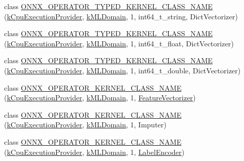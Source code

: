 \begin{DoxyCompactItemize}
\item 
class \mbox{\hyperlink{namespaceonnxruntime_1_1ml_a7ea36715d290134d65e5d820380a5ae7}{O\+N\+N\+X\+\_\+\+O\+P\+E\+R\+A\+T\+O\+R\+\_\+\+T\+Y\+P\+E\+D\+\_\+\+K\+E\+R\+N\+E\+L\+\_\+\+C\+L\+A\+S\+S\+\_\+\+N\+A\+ME}} (\mbox{\hyperlink{namespaceonnxruntime_a394a3c7e50622de1f203a96df592060d}{k\+Cpu\+Execution\+Provider}}, \mbox{\hyperlink{namespaceonnxruntime_a76df7dd63759039fc62486d6691e70e5}{k\+M\+L\+Domain}}, 1, int64\+\_\+t\+\_\+string, Dict\+Vectorizer)
\item 
class \mbox{\hyperlink{namespaceonnxruntime_1_1ml_abb607362e12f644526ed85340eddeaf0}{O\+N\+N\+X\+\_\+\+O\+P\+E\+R\+A\+T\+O\+R\+\_\+\+T\+Y\+P\+E\+D\+\_\+\+K\+E\+R\+N\+E\+L\+\_\+\+C\+L\+A\+S\+S\+\_\+\+N\+A\+ME}} (\mbox{\hyperlink{namespaceonnxruntime_a394a3c7e50622de1f203a96df592060d}{k\+Cpu\+Execution\+Provider}}, \mbox{\hyperlink{namespaceonnxruntime_a76df7dd63759039fc62486d6691e70e5}{k\+M\+L\+Domain}}, 1, int64\+\_\+t\+\_\+float, Dict\+Vectorizer)
\item 
class \mbox{\hyperlink{namespaceonnxruntime_1_1ml_af807d4f4a563446d130e43cbb6556b87}{O\+N\+N\+X\+\_\+\+O\+P\+E\+R\+A\+T\+O\+R\+\_\+\+T\+Y\+P\+E\+D\+\_\+\+K\+E\+R\+N\+E\+L\+\_\+\+C\+L\+A\+S\+S\+\_\+\+N\+A\+ME}} (\mbox{\hyperlink{namespaceonnxruntime_a394a3c7e50622de1f203a96df592060d}{k\+Cpu\+Execution\+Provider}}, \mbox{\hyperlink{namespaceonnxruntime_a76df7dd63759039fc62486d6691e70e5}{k\+M\+L\+Domain}}, 1, int64\+\_\+t\+\_\+double, Dict\+Vectorizer)
\item 
class \mbox{\hyperlink{namespaceonnxruntime_1_1ml_ab478b918b30f75237fe75262f5846436}{O\+N\+N\+X\+\_\+\+O\+P\+E\+R\+A\+T\+O\+R\+\_\+\+K\+E\+R\+N\+E\+L\+\_\+\+C\+L\+A\+S\+S\+\_\+\+N\+A\+ME}} (\mbox{\hyperlink{namespaceonnxruntime_a394a3c7e50622de1f203a96df592060d}{k\+Cpu\+Execution\+Provider}}, \mbox{\hyperlink{namespaceonnxruntime_a76df7dd63759039fc62486d6691e70e5}{k\+M\+L\+Domain}}, 1, \mbox{\hyperlink{classonnxruntime_1_1ml_1_1FeatureVectorizer}{Feature\+Vectorizer}})
\item 
class \mbox{\hyperlink{namespaceonnxruntime_1_1ml_adf3976bbe4dc37ecbf0b965049ba1460}{O\+N\+N\+X\+\_\+\+O\+P\+E\+R\+A\+T\+O\+R\+\_\+\+K\+E\+R\+N\+E\+L\+\_\+\+C\+L\+A\+S\+S\+\_\+\+N\+A\+ME}} (\mbox{\hyperlink{namespaceonnxruntime_a394a3c7e50622de1f203a96df592060d}{k\+Cpu\+Execution\+Provider}}, \mbox{\hyperlink{namespaceonnxruntime_a76df7dd63759039fc62486d6691e70e5}{k\+M\+L\+Domain}}, 1, Imputer)
\item 
class \mbox{\hyperlink{namespaceonnxruntime_1_1ml_ab18ec3a3fc651fa6eac9ce6be0c97295}{O\+N\+N\+X\+\_\+\+O\+P\+E\+R\+A\+T\+O\+R\+\_\+\+K\+E\+R\+N\+E\+L\+\_\+\+C\+L\+A\+S\+S\+\_\+\+N\+A\+ME}} (\mbox{\hyperlink{namespaceonnxruntime_a394a3c7e50622de1f203a96df592060d}{k\+Cpu\+Execution\+Provider}}, \mbox{\hyperlink{namespaceonnxruntime_a76df7dd63759039fc62486d6691e70e5}{k\+M\+L\+Domain}}, 1, \mbox{\hyperlink{classonnxruntime_1_1ml_1_1LabelEncoder}{Label\+Encoder}})

\end{DoxyCompactItemize}
